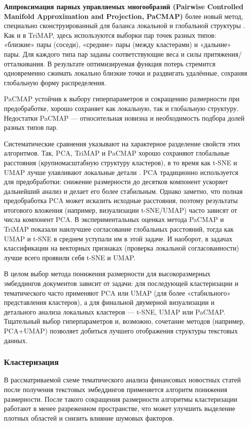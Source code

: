 \textbf{Аппроксимация парных управляемых многообразий (Pairwise Controlled Manifold Approximation and Projection,
PaCMAP)} более новый метод, специально сконструированный для баланса локальной и глобальной структуры
\parencite{PACMAP2021}. Как и в TriMAP, здесь используются выборки пар точек разных типов: «близкие» пары (соседи),
«средние» пары (между кластерами) и «дальние» пары. Для каждого типа пар заданы соответствующие веса и силы
притяжения/отталкивания. В результате оптимизируемая функция потерь стремится одновременно сжимать локально близкие
точки и раздвигать удалённые, сохраняя глобальную форму распределения.

PaCMAP устойчив к выбору гиперпараметров и сокращению размерности при предобработке, хорошо сохраняет как локальную,
так и глобальную структуру. Недостатки PaCMAP --- относительная новизна и необходимость подбора долей разных типов пар.

Систематические сравнения указывают на характерное разделение свойств этих алгоритмов. Так, PCA, TriMAP и PaCMAP
хорошо сохраняют глобальные расстояния (крупномасштабную структуру кластеров), в то время как t-SNE и UMAP лучше
улавливают локальные детали \parencite{huang2022towards}. PCA традиционно используется для предобработки: снижение
размерности до десятков компонент ускоряет дальнейший анализ и делает его более стабильным. Однако заметно, что полная
предобработка PCA может исказить исходные расстояния, поэтому результаты итогового вложения (например, визуализации
t-SNE/UMAP) часто зависят от числа компонент PCA. В экспериментальных оценках метода PaCMAP и TriMAP показали
наилучшее согласование глобальных расстояний, тогда как UMAP и t-SNE в среднем уступали им в этой задаче.
И наоборот, в задачах классификации на векторных признаках (проверка локальной согласованности) лучше всего
проявили себя t-SNE и UMAP.

В целом выбор метода понижения размерности для высокоразмерных эмбеддингов документов зависит от задачи:
для последующей кластеризации и тематического часто применяют PCA или UMAP (для более «стабильного» представления
кластеров), а для финальной двумерной визуализации и детального анализа локальных кластеров --- t-SNE, UMAP или PaCMAP.
Тщательный выбор гиперпараметров и, возможно, сочетание методов (например, PCA+UMAP) позволяет добиться лучшего
отображения структуры текстовых данных.

\subsubsection{Кластеризация}
В рассматриваемой схеме тематического анализа финансовых новостных статей после получения текстовых
эмбеддингов применяется алгоритм понижения размерности. После такого сокращения размерности алгоритмы
кластеризации работают в менее разреженном пространстве, что может улучшить выделение плотных областей
и снизить влияние шумовых факторов.

